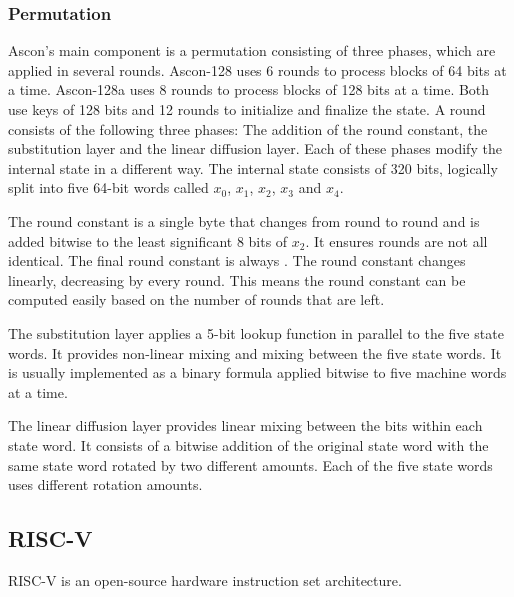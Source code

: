 
\subsubsection{Permutation}

Ascon's main component is a permutation consisting of three phases, which are
applied in several rounds. Ascon-128 uses 6 rounds to process blocks of 64 bits
at a time. Ascon-128a uses 8 rounds to process blocks of 128 bits at a time.
Both use keys of 128 bits and 12 rounds to initialize and finalize the state. A
round consists of the following three phases: The addition of the round
constant, the substitution layer and the linear diffusion layer. Each of these
phases modify the internal state in a different way. The internal state consists
of 320 bits, logically split into five 64-bit words called $x_0$, $x_1$, $x_2$,
$x_3$ and $x_4$.

The round constant is a single byte that changes from round to round and is
added bitwise to the least significant 8 bits of $x_2$. It ensures rounds are
not all identical. The final round constant is always . The round
constant changes linearly, decreasing by  every round. This means
the round constant can be computed easily based on the number of rounds that are
left.

The substitution layer applies a 5-bit lookup function in parallel to the five
state words. It provides non-linear mixing and mixing between the five state
words. It is usually implemented as a binary formula applied bitwise to five
machine words at a time.

The linear diffusion layer provides linear mixing between the bits within each
state word. It consists of a bitwise addition of the original state word with
the same state word rotated by two different amounts. Each of the five state
words uses different rotation amounts.

\subsection{RISC-V}
RISC-V\cite{riscv} is an open-source hardware instruction set architecture.

